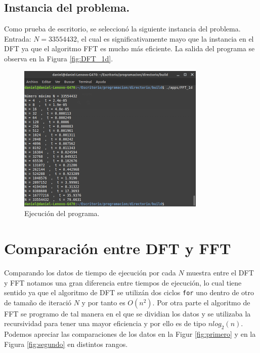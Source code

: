 \documentclass[12pt,letterpaper]{article}
\begin{document}
\subsection{Instancia del problema.}
Como prueba de escritorio, se seleccion\'o la siguiente instancia del problema. Entrada: $N=33554432$, el cual es significativamente mayo que la instancia en el DFT ya que el algoritmo FFT es mucho m\'as eficiente. La salida del programa se observa en la Figura \ref{fig:DFT_1d}.
\begin{figure}[ht!]
  \centering
  \includegraphics[width=0.8\textwidth]{figures/FFT_1d}
  \caption{Ejecución del programa.}
  \label{fig:FFT_1d}
\end{figure}

\newpage

\section{Comparaci\'on entre DFT y FFT}

Comparando los datos de tiempo de ejecuci\'on por cada $N$ muestra entre el DFT y FFT notamos una gran diferencia entre tiempos de ejecuci\'on, lo cual tiene sentido ya que el algoritmo de DFT se utiliz\'an dos ciclos \texttt{for} uno dentro de otro de tamaño de iteraci\'o $N$ y por tanto es $O(n^2)$. Por otra parte el algoritmo de FFT se programo de tal manera en el que se dividian los datos y se utilizaba la recursividad para tener una mayor eficiencia y por ello es de tipo $nlog_2(n)$. Podemos apreciar las comparaciones de los datos en la Figur \ref{fig:primero} y en la Figura \ref{fig:segundo} en distintos rangos.
\end{document}
